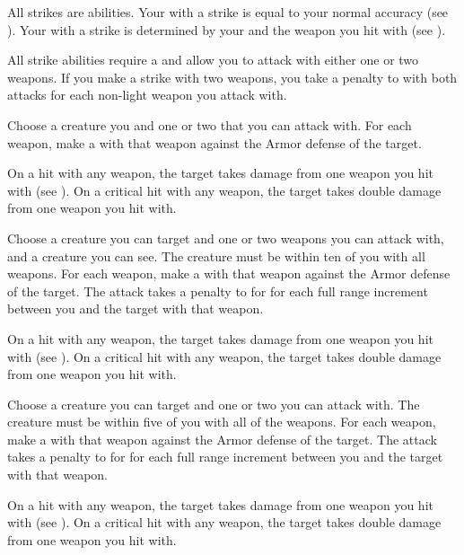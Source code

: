         All strikes are  abilities.
        Your  with a strike is equal to your normal accuracy (see ).
        Your  with a strike is determined by your  and the weapon you hit with (see ).

        \label{Two-Weapon Strikes}
        All strike abilities require a  and allow you to attack with either one or two weapons.
        If you make a strike with two weapons, you take a  penalty to  with both attacks for each non-light weapon you attack with.

        \begin{freeability}{}
            Choose a creature you  and one or two  that you can attack with.
            For each weapon, make a  with that weapon against the Armor defense of the target.

            On a hit with any weapon, the target takes damage from one weapon you hit with (see ).
            On a critical hit with any weapon, the target takes double damage from one weapon you hit with.
        \end{freeability}

        \begin{freeability}{}
            Choose a creature you can target and one or two  weapons you can attack with, and a creature you can see.
            The creature must be within ten  of you with all weapons.
            For each weapon, make a  with that weapon against the Armor defense of the target.
            The attack takes a  penalty to  for for each full range increment between you and the target with that weapon.

            On a hit with any weapon, the target takes damage from one weapon you hit with (see ).
            On a critical hit with any weapon, the target takes double damage from one weapon you hit with.
        \end{freeability}

        \begin{freeability}{}
            Choose a creature you can target and one or two  you can attack with.
            The creature must be within five  of you with all of the weapons.
            For each weapon, make a  with that weapon against the Armor defense of the target.
            The attack takes a  penalty to  for for each full range increment between you and the target with that weapon.

            On a hit with any weapon, the target takes damage from one weapon you hit with (see ).
            On a critical hit with any weapon, the target takes double damage from one weapon you hit with.
        \end{freeability}

